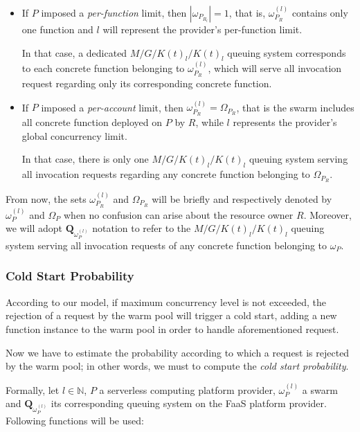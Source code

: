 \documentclass[12pt,a4paper]{report}
\newcommand{\N}{\mathbb{N}}
\begin{document}
\begin{itemize}
	
	\item If $P$ imposed a \textit{per-function} limit, then $|\omega_{P_{R_l}}| = 1$, that is, $\omega_{P_R}^{(l)}$ contains only one function and $l$ will represent the provider's per-function limit. 
	
	In that case, a dedicated $M/G/K(t)_{l}/K(t)_{l}$ queuing system corresponds to each concrete function belonging to $\omega_{P_R}^{(l)}$, which will serve all invocation request regarding only its corresponding concrete function.  
	
	\item If $P$ imposed a \textit{per-account} limit, then $\omega_{P_R}^{(l)} = \Omega_{P_R}$, that is the swarm includes all concrete function deployed on $P$ by $R$, while $l$ represents the provider's global concurrency limit. 
	
	In that case, there is only one $M/G/K(t)_{l}/K(t)_{l}$ queuing system serving all invocation requests regarding any concrete function belonging to $\Omega_{P_R}$. 

\end{itemize}

From now, the sets $\omega_{P_R}^{(l)}$ and $\Omega_{P_R}$ will be briefly and respectively denoted by $\omega_{P}^{(l)}$ and $\Omega_{P}$ when no confusion can arise about the resource owner $R$. Moreover, we will adopt $\textbf{Q}_{\omega_{P}^{(l)}}$ notation to refer to the $M/G/K(t)_{l}/K(t)_{l}$ queuing system serving all invocation requests of any concrete function belonging to $\omega_{P}$. 

\subsubsection{Cold Start Probability}

According to our model, if maximum concurrency level is not exceeded, the rejection of a request by the warm pool will trigger a cold start, adding a new function instance to the warm pool in order to handle aforementioned request. 

Now we have to estimate the probability according to which a request is rejected by the warm pool; in other words, we must to compute the \textit{cold start probability}. 

Formally, let $l \in \N$, $P$ a serverless computing platform provider, $\omega_{P}^{(l)}$ a swarm and $\textbf{Q}_{\omega_{P}^{(l)}}$ its corresponding queuing system on the FaaS platform provider. Following functions will be used:
\end{document}
